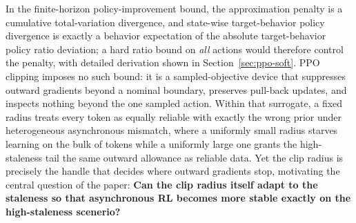 In the finite-horizon policy-improvement bound, the approximation penalty is a cumulative total-variation divergence, and state-wise target-behavior policy divergence is exactly a behavior expectation of the absolute target-behavior policy ratio deviation; a hard ratio bound on \emph{all} actions would therefore control the penalty, with detailed derivation shown in Section~\ref{sec:ppo-soft}. PPO clipping imposes no such bound: it is a sampled-objective device that suppresses outward gradients beyond a nominal boundary, preserves pull-back updates, and inspects nothing beyond the one sampled action. Within that surrogate, a fixed radius treats every token as equally reliable with exactly the wrong prior under heterogeneous asynchronous mismatch, where a uniformly small radius starves learning on the bulk of tokens while a uniformly large one grants the high-staleness tail the same outward allowance as reliable data.  Yet the clip radius is precisely the handle that decides where outward gradients stop, motivating the central question of the paper: \textbf{Can the clip radius itself adapt to the staleness so that asynchronous RL becomes more stable exactly on the high-staleness scenerio?}
 

